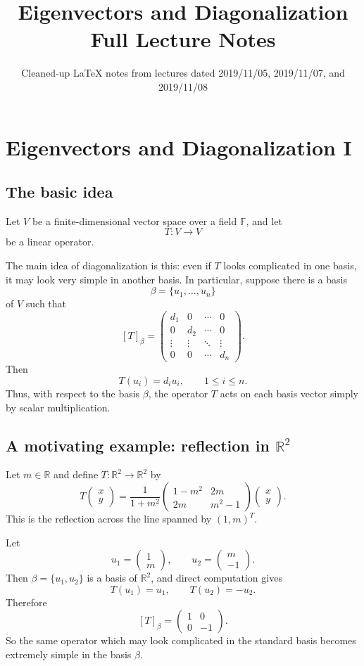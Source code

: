 \documentclass[11pt]{article}
\title{Eigenvectors and Diagonalization\\\large Full Lecture Notes}
\author{Cleaned-up LaTeX notes from lectures dated 2019/11/05, 2019/11/07, and 2019/11/08}
\date{}
\newcommand{\F}{\mathbb F}
\newcommand{\R}{\mathbb R}
\theoremstyle{definition}
\theoremstyle{plain}
\begin{document}
\maketitle
\tableofcontents

\section{Eigenvectors and Diagonalization I}

\subsection{The basic idea}

Let $V$ be a finite-dimensional vector space over a field $\F$, and let
\[
T:V\to V
\]
be a linear operator.

The main idea of diagonalization is this: even if $T$ looks complicated in one basis, it may look very simple in another basis.  In particular, suppose there is a basis
\[
\beta=\{u_1,\dots,u_n\}
\]
of $V$ such that
\[
[T]_{\beta}=\begin{pmatrix}
 d_1&0&\cdots&0\\
 0&d_2&\cdots&0\\
 \vdots&\vdots&\ddots&\vdots\\
 0&0&\cdots&d_n
\end{pmatrix}.
\]
Then
\[
T(u_i)=d_i u_i,\qquad 1\leq i\leq n.
\]
Thus, with respect to the basis $\beta$, the operator $T$ acts on each basis vector simply by scalar multiplication.

\subsection{A motivating example: reflection in $\R^2$}

Let $m\in\R$ and define $T:\R^2\to\R^2$ by
\[
T\begin{pmatrix}x\\y\end{pmatrix}
=\frac{1}{1+m^2}
\begin{pmatrix}
1-m^2&2m\\
2m&m^2-1
\end{pmatrix}
\begin{pmatrix}x\\y\end{pmatrix}.
\]
This is the reflection across the line spanned by $(1,m)^T$.

Let
\[
u_1=\begin{pmatrix}1\\m\end{pmatrix},
\qquad
u_2=\begin{pmatrix}m\\-1\end{pmatrix}.
\]
Then $\beta=\{u_1,u_2\}$ is a basis of $\R^2$, and direct computation gives
\[
T(u_1)=u_1,
\qquad
T(u_2)=-u_2.
\]
Therefore
\[
[T]_{\beta}=\begin{pmatrix}1&0\\0&-1\end{pmatrix}.
\]
So the same operator which may look complicated in the standard basis becomes extremely simple in the basis $\beta$.
\end{document}

